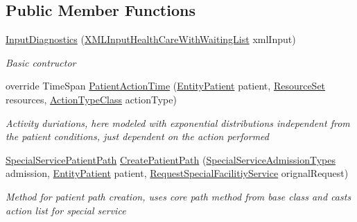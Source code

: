 \subsection*{Public Member Functions}
\begin{DoxyCompactItemize}
\item 
\hyperlink{class_sample_hospital_model_1_1_diagnostics_1_1_input_diagnostics_ad6ab2fbe4294d6c1bde7349adb207bcb}{Input\+Diagnostics} (\hyperlink{class_general_health_care_elements_1_1_input_1_1_x_m_l_input_health_care_with_waiting_list}{X\+M\+L\+Input\+Health\+Care\+With\+Waiting\+List} xml\+Input)
\begin{DoxyCompactList}\small\item\em Basic contructor \end{DoxyCompactList}\item 
override Time\+Span \hyperlink{class_sample_hospital_model_1_1_diagnostics_1_1_input_diagnostics_a12d3e27280a29486851b1eac61e90030}{Patient\+Action\+Time} (\hyperlink{class_general_health_care_elements_1_1_entities_1_1_entity_patient}{Entity\+Patient} patient, \hyperlink{class_general_health_care_elements_1_1_resource_handling_1_1_resource_set}{Resource\+Set} resources, \hyperlink{class_general_health_care_elements_1_1_general_classes_1_1_action_types_and_paths_1_1_action_type_class}{Action\+Type\+Class} action\+Type)
\begin{DoxyCompactList}\small\item\em Activity duriations, here modeled with exponential distributions independent from the patient conditions, just dependent on the action performed \end{DoxyCompactList}\item 
\hyperlink{class_general_health_care_elements_1_1_special_facility_1_1_special_service_patient_path}{Special\+Service\+Patient\+Path} \hyperlink{class_sample_hospital_model_1_1_diagnostics_1_1_input_diagnostics_adfeafa716d347d6a870a5e20d9c60f53}{Create\+Patient\+Path} (\hyperlink{class_general_health_care_elements_1_1_treatment_admission_types_1_1_special_service_admission_types}{Special\+Service\+Admission\+Types} admission, \hyperlink{class_general_health_care_elements_1_1_entities_1_1_entity_patient}{Entity\+Patient} patient, \hyperlink{class_general_health_care_elements_1_1_special_facility_1_1_request_special_facilitiy_service}{Request\+Special\+Facilitiy\+Service} orignal\+Request)
\begin{DoxyCompactList}\small\item\em Method for patient path creation, uses core path method from base class and casts action list for special service \end{DoxyCompactList}\item 

\end{DoxyCompactItemize}
